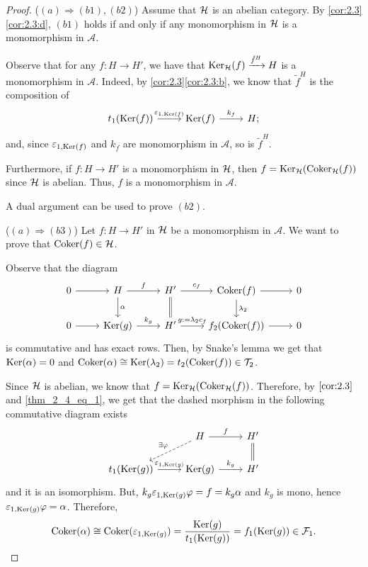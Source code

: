 \begin{proof}
  ($(a)\Rightarrow (b1),(b2)$) Assume that $\mathcal{H}$ is an abelian category. By \ref{cor:2.3}\ref{cor:2.3:d}, $(b1)$ holds if and only if any monomorphism in $\mathcal{H}$ is a monomorphism in $\mathscr{A}$.

  Observe that for any $f:H\to H'$, we have that $\operatorname{Ker}_{\mathcal{H}}(f)\xrightarrow{\tilde{f}^H}H$ is a monomorphism in $\mathscr{A}$. Indeed, by \ref{cor:2.3}\ref{cor:2.3:b}, we know that $\tilde{f}^H$ is the composition of
  \begin{equation*}
    \begin{tikzcd}
      t_1(\Ker(f))\arrow{r}{\varepsilon_{1,\Ker(f)}}
        & \Ker(f)\arrow{r}{k_f}
          & H;
    \end{tikzcd}
  \end{equation*}
  and, since $\varepsilon_{1,\operatorname{Ker}(f)}$ and $k_f$ are monomorphism in $\mathscr{A}$, so is $\tilde{f}^H$.

  Furthermore, if $f:H\to H'$ is a monomorphism in $\mathcal{H}$, then $f=\operatorname{Ker}_{\mathcal{H}}(\operatorname{Coker}_{\mathcal{H}}(f))$ since $\mathcal{H}$ is abelian. Thus, $f$ is a monomorphism in $\mathscr{A}$.

  A dual argument can be used to prove $(b2)$.

  ($(a)\Rightarrow (b3)$) Let $f:H\to H'$ in $\mathcal{H}$ be a monomorphism in $\mathscr{A}$. We want to prove that $\operatorname{Coker}(f)\in\mathcal{H}$.

  Observe that the diagram
  \begin{equation}\label{thm_2_4_eq_1}
    \begin{tikzcd}
      0\arrow{r}
      & H\arrow{r}{f}\arrow{d}{\alpha}
        & H'\arrow{r}{c_f}\arrow[equal]{d}
          & \Coker(f)\arrow{d}{\lambda_2}\arrow{r}
            & 0\\
      0 \arrow{r}
      & \Ker(g)\arrow{r}{k_g}
        & H' \arrow{r}{g:=\lambda_2c_f}
          & f_2(\Coker(f)) \arrow{r}
            & 0
    \end{tikzcd}
  \end{equation}
  is commutative and has exact rows. Then, by Snake's lemma we get that $\operatorname{Ker}(\alpha)=0$ and $\operatorname{Coker}(\alpha)\cong\operatorname{Ker}(\lambda_2)=t_2(\operatorname{Coker}(f))\in\mathcal{T}_2$.

  Since $\mathcal{H}$ is abelian, we know that $f=\operatorname{Ker}_{\mathcal{H}}(\operatorname{Coker}_{\mathcal{H}}(f))$. Therefore, by $\ref{cor:2.3}$ and \eqref{thm_2_4_eq_1}, we get that the dashed morphism
  in the following commutative diagram exists
  \begin{equation*}
    \begin{tikzcd}
      & H\arrow{r}{f}\arrow[dashed]{dl}[']{\exists\varphi}
        & H'\arrow[equal]{d}\\
      t_1(\Ker(g))\arrow{r}{\varepsilon_{1,\Ker(g)}}
      & \Ker(g)\arrow{r}{k_g}
        & H'
    \end{tikzcd}
  \end{equation*}
  and it is an isomorphism. But, $k_g\varepsilon_{1,\operatorname{Ker}(g)}\varphi = f= k_g\alpha$ and $k_g$ is mono, hence $\varepsilon_{1,\operatorname{Ker}(g)}\varphi = \alpha$. Therefore,
  \begin{equation*}
    \operatorname{Coker}(\alpha)\cong \operatorname{Coker}(\varepsilon_{1,\operatorname{Ker}(g)})=\frac{\operatorname{Ker}(g)}{t_1(\operatorname{Ker}(g))}= f_1(\operatorname{Ker}(g))\in\mathcal{F}_1.
  \end{equation*}


\end{proof}

